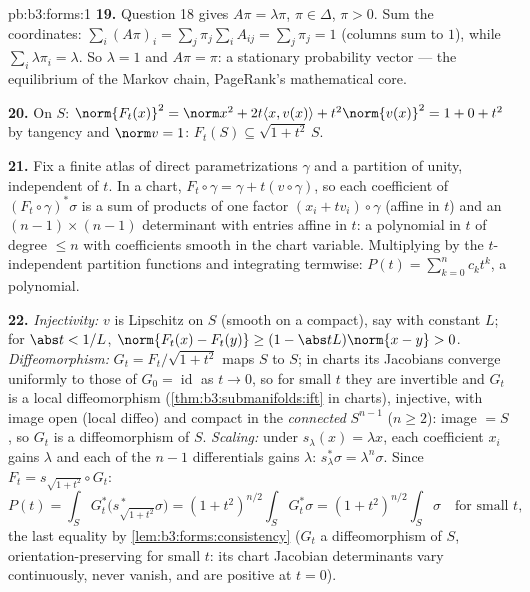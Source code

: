 \begin{solution}{pb:b3:forms:1}
\textbf{19.} Question 18 gives $A\pi = \lambda\pi$, $\pi \in
\Delta$, $\pi > 0$. Sum the coordinates: $\sum_i(A\pi)_i =
\sum_j\pi_j\sum_iA_{ij} = \sum_j\pi_j = 1$ (columns sum to
$1$), while $\sum_i\lambda\pi_i = \lambda$. So $\lambda = 1$
and $A\pi = \pi$: a stationary probability vector --- the
equilibrium of the Markov chain, PageRank's mathematical
core.

\textbf{20.} On $S$: $\norm{F_t(x)}^2 = \norm x^2 +
2t\langle x, v(x)\rangle + t^2\norm{v(x)}^2 = 1 + 0 + t^2$
by tangency and $\norm v = 1$: $F_t(S) \subseteq
\sqrt{1+t^2}\,S$.

\textbf{21.} Fix a finite atlas of direct parametrizations
$\gamma$ and a partition of unity, independent of $t$. In a
chart, $F_t\circ\gamma = \gamma + t(v\circ\gamma)$, so each
coefficient of $(F_t\circ\gamma)^*\sigma$ is a sum of
products of one factor $(x_i + tv_i)\circ\gamma$ (affine in
$t$) and an $(n-1)\times(n-1)$ determinant with entries
affine in $t$: a polynomial in $t$ of degree $\leq n$ with
coefficients smooth in the chart variable. Multiplying by
the $t$-independent partition functions and integrating
termwise: $P(t) = \sum_{k=0}^n c_kt^k$, a polynomial.

\textbf{22.} \emph{Injectivity:} $v$ is Lipschitz on $S$
(smooth on a compact), say with constant $L$; for $\abs t <
1/L$, $\norm{F_t(x) - F_t(y)} \geq (1 - \abs
tL)\norm{x - y} > 0$. \emph{Diffeomorphism:} $G_t =
F_t/\sqrt{1 + t^2}$ maps $S$ to $S$; in charts its Jacobians
converge uniformly to those of $G_0 = \operatorname{id}$ as
$t \to 0$, so for small $t$ they are invertible and $G_t$ is
a local diffeomorphism (\cref{thm:b3:submanifolds:ift} in
charts), injective, with image open (local diffeo) and
compact in the \emph{connected} $S^{n-1}$ ($n \geq 2$):
image $= S$, so $G_t$ is a diffeomorphism of $S$.
\emph{Scaling:} under $s_\lambda(x) = \lambda x$, each
coefficient $x_i$ gains $\lambda$ and each of the $n - 1$
differentials gains $\lambda$: $s_\lambda^*\sigma =
\lambda^n\sigma$. Since $F_t = s_{\sqrt{1+t^2}}\circ G_t$:
\[
P(t) = \int_SG_t^*\bigl(s_{\sqrt{1+t^2}}^{\,*}\sigma\bigr)
= (1 + t^2)^{n/2}\int_SG_t^*\sigma
= (1 + t^2)^{n/2}\int_S\sigma
\quad\text{for small } t,
\]
the last equality by \cref{lem:b3:forms:consistency} ($G_t$
a diffeomorphism of $S$, orientation-preserving for small
$t$: its chart Jacobian determinants vary continuously,
never vanish, and are positive at $t = 0$).


\end{solution}
